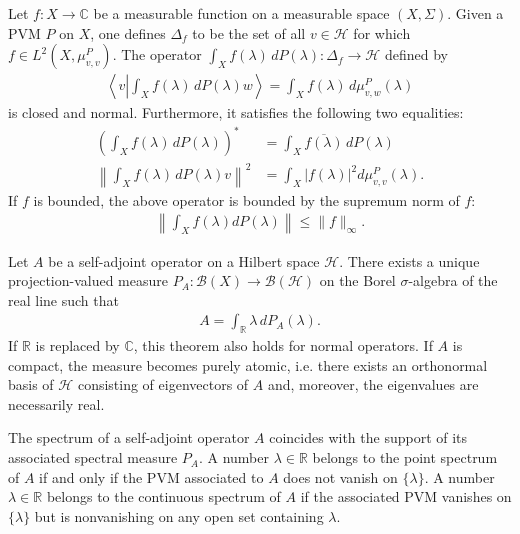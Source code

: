     \begin{property}
        Let $f:X\rightarrow\mathbb{C}$ be a measurable function on a measurable space $(X,\Sigma)$. Given a PVM $P$ on $X$, one defines $\Delta_f$ to be the set of all $v\in\mathcal{H}$ for which $f\in L^2(X,\mu^P_{v,v})$. The operator $\int_Xf(\lambda)\,dP(\lambda):\Delta_f\rightarrow\mathcal{H}$ defined by
        \begin{gather}
            \left\langle v\left|\int_Xf(\lambda)\,dP(\lambda)w\right.\right\rangle = \int_Xf(\lambda)\,d\mu^P_{v,w}(\lambda)
        \end{gather}
        is closed and normal. Furthermore, it satisfies the following two equalities:
        \begin{align}
            \left(\int_Xf(\lambda)\,dP(\lambda)\right)^* &= \int_X\overline{f(\lambda)}\,dP(\lambda)\\
            \left\|\int_Xf(\lambda)\,dP(\lambda)v\right\|^2 &= \int_X|f(\lambda)|^2d\mu^P_{v,v}(\lambda).
        \end{align}
        If $f$ is bounded, the above operator is bounded by the supremum norm of $f$:
        \begin{gather}
            \left\|\int_Xf(\lambda)dP(\lambda)\right\|\leq\|f\|_\infty.
        \end{gather}
    \end{property}

    \begin{theorem}
        Let $A$ be a self-adjoint operator on a Hilbert space $\mathcal{H}$. There exists a unique projection-valued measure $P_A:\mathcal{B}(X)\rightarrow\mathcal{B}(\mathcal{H})$ on the Borel $\sigma$-algebra of the real line such that
        \begin{gather}
            A = \int_\mathbb{R}\lambda\,dP_A(\lambda).
        \end{gather}
        If $\mathbb{R}$ is replaced by $\mathbb{C}$, this theorem also holds for normal operators. If $A$ is compact, the measure becomes purely atomic, i.e. there exists an orthonormal basis of $\mathcal{H}$ consisting of eigenvectors of $A$ and, moreover, the eigenvalues are necessarily real.
    \end{theorem}
    \begin{property}
        The spectrum of a self-adjoint operator $A$ coincides with the support of its associated spectral measure $P_A$. A number $\lambda\in\mathbb{R}$ belongs to the point spectrum of $A$ if and only if the PVM associated to $A$ does not vanish on $\{\lambda\}$. A number $\lambda\in\mathbb{R}$ belongs to the continuous spectrum of $A$ if the associated PVM vanishes on $\{\lambda\}$ but is nonvanishing on any open set containing $\lambda$.
    \end{property}

